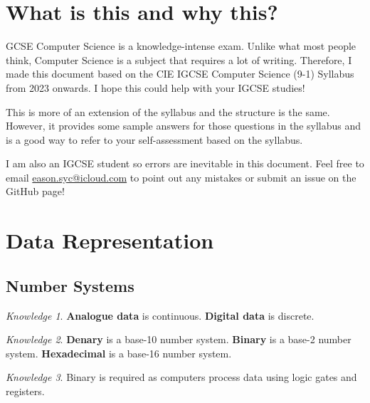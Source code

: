 \documentclass[8pt]{article}
\author{\Author}
\title{\Title}
\date{Version 1. \Date}
\theoremstyle{remark}
\newtheorem{knowledge}{Knowledge}[subsection]
\begin{document}
	\maketitle

	\tableofcontents

    \section*{What is this and why this?}
    
        GCSE Computer Science is a knowledge-intense exam. Unlike what most people think, Computer Science is a subject that requires a lot of writing. Therefore, I made this document based on the CIE IGCSE Computer Science (9-1) Syllabus from 2023 onwards. I hope this could help with your IGCSE studies!

        This is more of an extension of the syllabus and the structure is the same. However, it provides some sample answers for those questions in the syllabus and is a good way to refer to your self-assessment based on the syllabus.

        I am also an IGCSE student so errors are inevitable in this document. Feel free to email \href{eason.syc@icloud.com}{eason.syc@icloud.com} to point out any mistakes or submit an issue on the GitHub page!
        
    \section{Data Representation}
        \subsection{Number Systems}

        \begin{knowledge}
            \textbf{Analogue data} is continuous. \textbf{Digital data} is discrete.
        \end{knowledge}

        \begin{knowledge}
            \textbf{Denary} is a base-10 number system. \textbf{Binary} is a base-2 number system. \textbf{Hexadecimal} is a base-16 number system.
        \end{knowledge}

        \begin{knowledge}
            Binary is required as computers process data using logic gates and registers.
        \end{knowledge}
\end{document}
